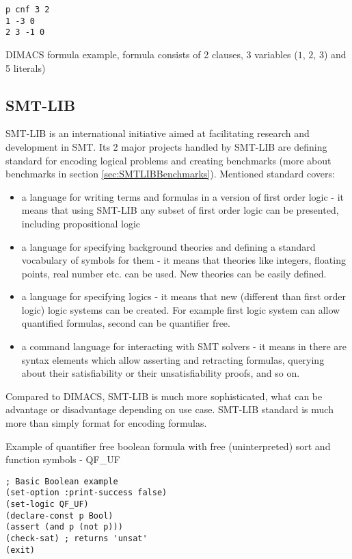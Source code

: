 \begin{listing}[H]
\begin{verbatim}
p cnf 3 2
1 -3 0
2 3 -1 0
\end{verbatim}
  \caption{DIMACS formula example, formula consists of 2 clauses, 3 variables ($1$, $2$, $3$) and 5 literals)}
  \label{lis:DIMACSExample}
\end{listing}

\subsection{SMT-LIB}
\label{sec:SMTLIB}

SMT-LIB \cite{BarFT-RR-17} is an international initiative aimed at facilitating research and development in \gls{SMT}. Its 2 major projects handled by SMT-LIB are defining standard for encoding logical problems and creating benchmarks (more about benchmarks in section \ref{sec:SMTLIBBenchmarks}). Mentioned standard covers:

\begin{itemize}
  \item a language for writing terms and formulas in a version of first order logic - it means that using SMT-LIB any subset of first order logic can be presented, including propositional logic
  \item a language for specifying background theories and defining a standard vocabulary of symbols for them - it means that theories like integers, floating points, real number etc. can be used. New theories can be easily defined.
  \item a language for specifying logics - it means that new (different than first order logic) logic systems can be created. For example first logic system can allow quantified formulas, second can be quantifier free.
  \item a command language for interacting with SMT solvers - it means in there are syntax elements which allow asserting and retracting formulas, querying about their satisfiability or their unsatisfiability proofs, and so on.
\end{itemize}

Compared to DIMACS, SMT-LIB is much more sophisticated, what can be advantage or disadvantage depending on use case. SMT-LIB standard is much more than simply format for encoding formulas.

\begin{listing}[H]
  \caption{Example of quantifier free boolean formula with free (uninterpreted) sort and function symbols - QF\_UF}
  \label{lis:SMTLIBExample}
  \begin{verbatim}
; Basic Boolean example
(set-option :print-success false)
(set-logic QF_UF)
(declare-const p Bool)
(assert (and p (not p))) 
(check-sat) ; returns 'unsat'
(exit)
  \end{verbatim}
\end{listing}

